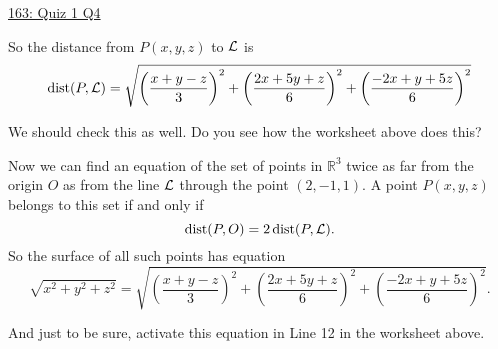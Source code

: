 \documentclass{ximera}
\begin{document}
\begin{question}
\begin{explanation}
\begin{onlineOnly}
    \begin{center}
\end{center}
\end{onlineOnly}

\href{https://www.desmos.com/3d/m9ovrs1a4c}{163: Quiz 1 Q4}

So the distance from $P(x,y,z)$ to ${\cal L}$ is 
\[
   \text{dist}(P, {\cal L}) = \sqrt{\left( \frac{x+y-z}{3}\right)^2 + \left( \frac{2x+5y+z}{6}\right)^2 + \left( \frac{-2x+y+5z}{6}\right)^2}
\]

We should check this as well. Do you see how the worksheet above does this?

Now we can find an equation of the set of points in $\mathbb{R}^3$ twice as far from the origin $O$ as from the line ${\cal L}$ through the point $(2,-1,1)$. A point $P(x,y,z)$ belongs to this set if and only if
\[
           \text{dist}(P,O) = 2\, \text{dist}(P,{\cal L}) .
\]
So the surface of all such points has equation
\[
        \sqrt{x^2 + y^2 + z^2} = \sqrt{\left( \frac{x+y-z}{3}\right)^2 + \left( \frac{2x+5y+z}{6}\right)^2 + \left( \frac{-2x+y+5z}{6}\right)^2} .
\]

And just to be sure, activate this equation in Line 12 in the worksheet above.


\end{explanation}



\end{question}
\end{document}
